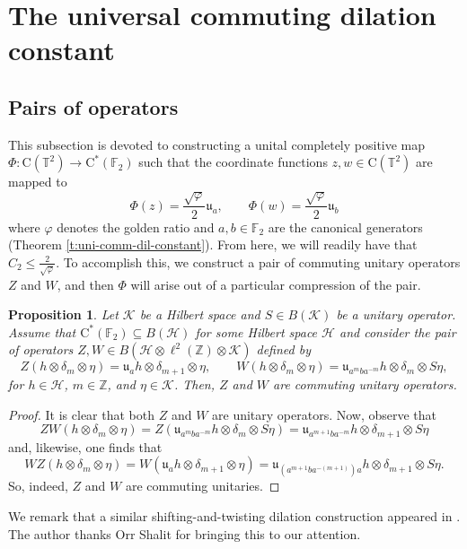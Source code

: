 \documentclass[10pt]{amsart}
\newcommand{\bF}{{\mathbb{F}}}
\newcommand{\bT}{{\mathbb{T}}}
\newcommand{\bZ}{{\mathbb{Z}}}
\renewcommand{\H}{{\mathcal{H}}}
\newcommand{\K}{{\mathcal{K}}}
\newcommand{\rC}{\mathrm{C}}
\renewcommand{\phi}{\varphi}
\newtheorem{proposition}[theorem]{Proposition}
\begin{document}
\section{The universal commuting dilation constant}\label{s:uni-comm-dil}

\subsection{Pairs of operators}\label{ss:pairs}

This subsection is devoted to constructing a unital completely positive map $\Phi:\rC(\bT^2)\rightarrow\rC^*(\bF_2)$ such that the coordinate functions $z,w\in\rC(\bT^2)$ are mapped to
\[
\Phi(z) = \frac{\sqrt{\phi}}{2}\mathfrak{u}_a, \qquad \Phi(w) = \frac{\sqrt{\phi}}{2}\mathfrak{u}_b
\]
where $\phi$ denotes the golden ratio and $a,b\in\bF_2$ are the canonical generators (Theorem \ref{t:uni-comm-dil-constant}). From here, we will readily have that $C_2\leq \frac{2}{\sqrt{\phi}}$. To accomplish this, we construct a pair of commuting unitary operators $Z$ and $W$, and then $\Phi$ will arise out of a particular compression of the pair.

\begin{proposition}\label{p:cocyc-uni-comm-uni}
Let $\K$ be a Hilbert space and $S\in B(\K)$ be a unitary operator. Assume that $\rC^*(\bF_2)\subseteq B(\H)$ for some Hilbert space $\H$ and consider the pair of operators $Z,W\in B(\H\otimes \ell^2(\bZ)\otimes\K)$ defined by
    \[
        Z(h\otimes\delta_m\otimes\eta) = \mathfrak{u}_ah\otimes\delta_{m+1}\otimes\eta, \qquad W(h\otimes\delta_m\otimes\eta) = \mathfrak{u}_{a^m ba^{-m}}h\otimes\delta_m\otimes S\eta,
    \]
for $h\in\H$, $m\in\bZ$, and $\eta\in\K$. Then, $Z$ and $W$ are commuting unitary operators.
\end{proposition}

\begin{proof}
    It is clear that both $Z$ and $W$ are unitary operators. Now, observe that
    \[
        ZW(h\otimes\delta_m\otimes\eta) = Z(\mathfrak{u}_{a^m ba^{-m}}h\otimes\delta_m\otimes S\eta) = \mathfrak{u}_{a^{m+1}ba^{-m}}h \otimes \delta_{m+1}\otimes S\eta
    \]
    and, likewise, one finds that
    \[
        WZ(h\otimes\delta_m\otimes\eta) = W(\mathfrak{u}_a  h \otimes\delta_{m+1}\otimes \eta) = \mathfrak{u}_{(a^{m+1}ba^{-(m+1)})a}h \otimes \delta_{m+1}\otimes S\eta.
    \]
    So, indeed, $Z$ and $W$ are commuting unitaries.
\end{proof}

We remark that a similar shifting-and-twisting dilation construction appeared in \cite[Lemma 3.1]{gerhold2024dilation}. The author thanks Orr Shalit for bringing this to our attention.
\end{document}
